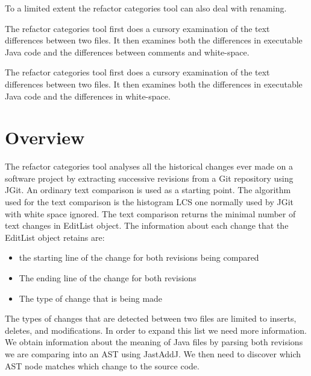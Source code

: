 To a limited extent the refactor categories tool can also deal with renaming.

The refactor categories tool first does a cursory examination of the text differences between two files. It then examines both the differences in executable Java code and the differences between comments and white-space. 

The refactor categories tool first does a cursory examination of the text differences between two files. It then examines both the differences in executable Java code and the differences in white-space.


\section{Overview}
The refactor categories tool analyses all the historical changes ever made on a software project by extracting successive revisions from a Git repository using JGit.
An ordinary text comparison is used as a starting point.  The algorithm used for the text comparison is the histogram LCS one normally used by JGit with white space ignored. The text comparison returns the minimal number of text changes in EditList object.  The information about each change that the EditList object retains are:

\begin{itemize}
  \item the starting line of the change for both revisions being compared
  \item The ending line of the change for both revisions 
  \item The type of change that is being made
\end{itemize}

The types of changes that are detected between two files are limited to inserts, deletes, and modifications. In order to expand this list we need more information.  We obtain information about the meaning of Java files by parsing both revisions we are comparing into an AST using JastAddJ. We then need to discover which AST node matches which change to the source code. 

